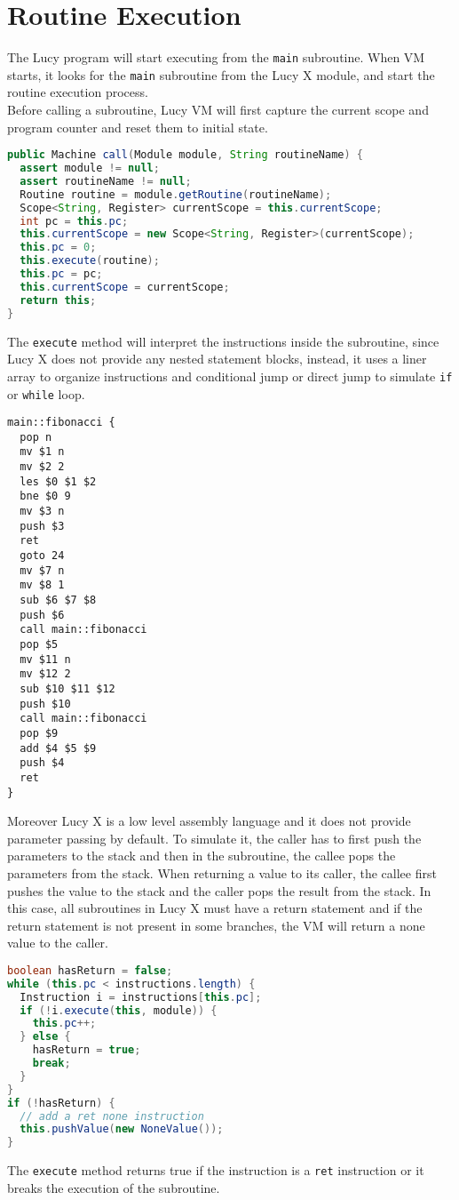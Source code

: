 \section{Routine Execution}
The Lucy program will start executing from the \texttt{main} subroutine. When VM starts, it looks for the \texttt{main} subroutine from the Lucy X module, and start the routine execution process. \\
Before calling a subroutine, Lucy VM will first capture the current scope and program counter and reset them to initial state.
\begin{lstlisting}[language=java]
public Machine call(Module module, String routineName) {
  assert module != null;
  assert routineName != null;
  Routine routine = module.getRoutine(routineName);
  Scope<String, Register> currentScope = this.currentScope;
  int pc = this.pc;
  this.currentScope = new Scope<String, Register>(currentScope);
  this.pc = 0;
  this.execute(routine);
  this.pc = pc;
  this.currentScope = currentScope;
  return this;
}
\end{lstlisting}
The \texttt{execute} method will interpret the instructions inside the subroutine, since Lucy X does not provide any nested statement blocks, instead, it uses a liner array to organize instructions and conditional jump or direct jump to simulate \texttt{if} or \texttt{while} loop.
\begin{lstlisting}[language=LucyX]
main::fibonacci {
  pop n
  mv $1 n
  mv $2 2
  les $0 $1 $2
  bne $0 9
  mv $3 n
  push $3
  ret
  goto 24
  mv $7 n
  mv $8 1
  sub $6 $7 $8
  push $6
  call main::fibonacci
  pop $5
  mv $11 n
  mv $12 2
  sub $10 $11 $12
  push $10
  call main::fibonacci
  pop $9
  add $4 $5 $9
  push $4
  ret
}
\end{lstlisting}
Moreover Lucy X is a low level assembly language and it does not provide parameter passing by default. To simulate it, the caller has to first push the parameters to the stack and then in the subroutine, the callee pops the parameters from the stack. When returning a value to its caller, the callee first pushes the value to the stack and the caller pops the result from the stack. In this case, all subroutines in Lucy X must have a return statement and if the return statement is not present in some branches, the VM will return a none value to the caller.
\begin{lstlisting}[language=java]
boolean hasReturn = false;
while (this.pc < instructions.length) {
  Instruction i = instructions[this.pc];
  if (!i.execute(this, module)) {
    this.pc++;
  } else {
    hasReturn = true;
    break;
  }
}
if (!hasReturn) {
  // add a ret none instruction
  this.pushValue(new NoneValue());
}
\end{lstlisting}
The \texttt{execute} method returns true if the instruction is a \texttt{ret} instruction or it breaks the execution of the subroutine.

